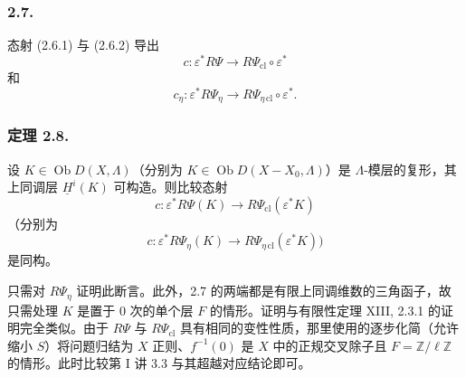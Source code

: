 \subsubsection*{2.7.}
态射 (2.6.1) 与 (2.6.2) 导出
\[
c:\varepsilon^*R\Psi
\longrightarrow R\Psi_{\mathrm{cl}}\circ\varepsilon^*
\]
和
\[
c_\eta:\varepsilon^*R\Psi_\eta
\longrightarrow R\Psi_{\eta\,\mathrm{cl}}\circ\varepsilon^*.
\]

\subsubsection*{定理 2.8.}
设 $K\in\operatorname{Ob}D(X,\Lambda)$（分别为 $K\in\operatorname{Ob}D(X-X_0,\Lambda)$）是 $\Lambda$-模层的复形，其上同调层 $\underline H^i(K)$ 可构造。则比较态射
\[
c:\varepsilon^*R\Psi(K)
\longrightarrow R\Psi_{\mathrm{cl}}(\varepsilon^*K)
\]
（分别为
\[
c:\varepsilon^*R\Psi_\eta(K)
\longrightarrow R\Psi_{\eta\,\mathrm{cl}}(\varepsilon^*K))
\]
是同构。

只需对 $R\Psi_\eta$ 证明此断言。此外，2.7 的两端都是有限上同调维数的三角函子，故只需处理 $K$ 是置于 $0$ 次的单个层 $F$ 的情形。证明与有限性定理 XIII, 2.3.1 的证明完全类似。由于 $R\Psi$ 与 $R\Psi_{\mathrm{cl}}$ 具有相同的变性性质，那里使用的逐步化简（允许缩小 $S$）将问题归结为 $X$ 正则、$f^{-1}(0)$ 是 $X$ 中的正规交叉除子且 $F=\mathbb Z/\ell\mathbb Z$ 的情形。此时比较第 I 讲 3.3 与其超越对应结论即可。

